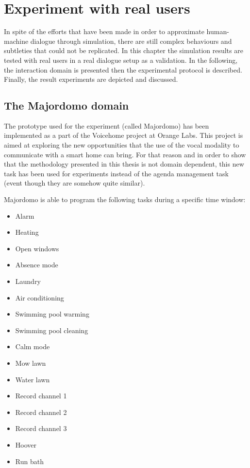 \chapter{Experiment with real users}

\label{ch:experiment}

	In spite of the efforts that have been made in order to approximate human-machine dialogue through simulation, there are still complex behaviours and subtleties that could not be replicated. In this chapter the simulation results are tested with real users in a real dialogue setup as a validation. In the following, the interaction domain is presented then the experimental protocol is described. Finally, the result experiments are depicted and discussed.

\section{The Majordomo domain}

	The prototype used for the experiment (called Majordomo) has been implemented as a part of the Voicehome project at Orange Labs. This project is aimed at exploring the new opportunities that the use of the vocal modality to communicate with a smart home can bring. For that reason and in order to show that the methodology presented in this thesis is not domain dependent, this new task has been used for experiments instead of the agenda management task (event though they are somehow quite similar).
	
	Majordomo is able to program the following tasks during a specific time window:
	
	\begin{itemize}
		\item Alarm
		\item Heating
		\item Open windows
		\item Absence mode
		\item Laundry
		\item Air conditioning
		\item Swimming pool warming
		\item Swimming pool cleaning
		\item Calm mode
		\item Mow lawn
		\item Water lawn
		\item Record channel 1
		\item Record channel 2
		\item Record channel 3
		\item Hoover
		\item Run bath
	\end{itemize}
	
